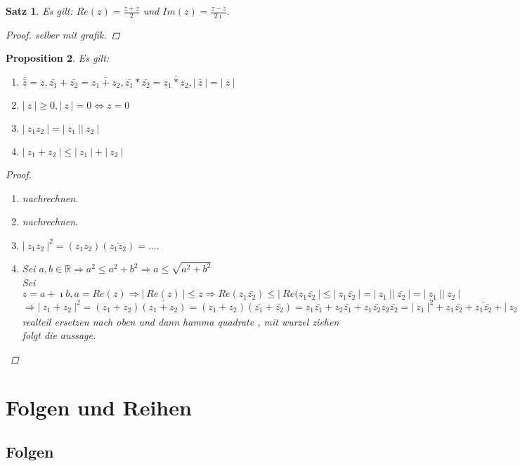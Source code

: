 \documentclass[a4paper,titlepage,oneside]{article}
\def\R{\ensuremath{\mathbb{R}} }
\def\im{\ensuremath{\imath} }
\newcommand{\abs}[1]{\ensuremath{\left|\:#1\:\right|}}
\theoremstyle{thmstyle}
\newtheorem{satz}{Satz}[subsection]
\newtheorem{prop}[satz]{Proposition}
\begin{document}
\begin{satz}
Es gilt: $Re(z) = \frac{z + \bar{z}}{2}$ und $Im(z) = \frac{z - \bar{z}}{2\im}$.
\begin{proof} selber mit grafik. %
\end{proof}
\end{satz}

\begin{prop}
Es gilt:
\begin{enumerate}[label=(\roman*)]
\item \( \bar{\bar{z}} = z, \bar{z_1} + \bar{z_2} = \bar{z_1 + z_2}, \bar{z_1} * \bar{z_2} = \bar{z_1 * z_2}, \abs{\bar{z}} = \abs{z} \)
\item \( \abs{z} \ge 0, \abs{z} = 0 \Leftrightarrow z = 0\)
\item \(\abs{z_1 z_2} = \abs{z_1} \abs{z_2}\)
\item \(\abs{z_1 + z_2} \le \abs{z_1} + \abs{z_2}\)
\end{enumerate}
\begin{proof}
\begin{enumerate}[label=(\roman*)]
\item nachrechnen. %
\item nachrechnen. %
\item \(\abs{z_1 z_2}^2 = (z_1 z_2)(\bar{z_1 z_2}) =  .... \) \\   %
\item Sei $a, b \in \R \Rightarrow a^2 \le a^2 + b^2 \Rightarrow a \le \sqrt{a^2 + b^2}$ \\
Sei $ z = a + \im b , a = Re(z) \Rightarrow \abs{Re(z)} \le z \Rightarrow Re(z_1 \bar{z_2}) \le \abs{Re(z_1 \bar{z_2}} \le \abs{z_1 \bar{z_2}} = \abs{z_1}\abs{\bar{z_2}} = \abs{z_1}\abs{z_2}$
$\Rightarrow \abs{z_1 + z_2}^2 = (z_1 + z_2)\bar{(z_1 + z_2)} = (z_1 + z_2)(\bar{z_1} + \bar{z_2}) = z_1\bar{z_1} + z_2\bar{z_1} + z_1\bar{z_2} z_2\bar{z_2} = \abs{z_1}^2 + z_1\bar{z_2} + \bar{z_1\bar{z_2}} + \abs{z_2}^2 = |z_1|^2 + 2 Re (z1 \bar{z2}) + |z_2|^2 \le $ realteil ersetzen nach oben und dann hamma quadrate , mit wurzel ziehen folgt die aussage. %
\end{enumerate}
\end{proof}
\end{prop}

\section{Folgen und Reihen}
\subsection{Folgen}
\end{document}

